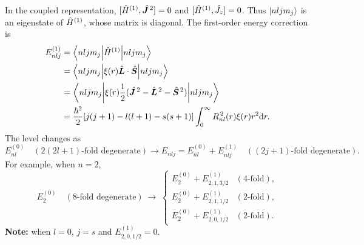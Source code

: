 In the coupled representation, $[\hat{H}^{(1)},\hat{\bm{J}}^{\,2}]=0$ and $[\hat{H}^{(1)},\hat{J}_z]=0$. Thus $\left|nljm_j\right\rangle$ is an eigenstate of $\hat{H}^{(1)}$, whose matrix is diagonal. The first-order energy correction is
\begin{equation}\begin{aligned}
 E_{nlj}^{(1)}&=\left\langle nljm_j\middle|\hat{H}^{(1)}\middle|nljm_j\right\rangle\\
 &=\left\langle nljm_j\middle|\xi(r)\hat{\bm{L}}\cdot\hat{\bm{S}}\middle|nljm_j\right\rangle\\
 &=\left\langle nljm_j\middle|\xi(r)\frac12
 (\hat{\bm{J}}^{\,2}-\hat{\bm{L}}^{\,2}-\hat{\bm{S}}^{\,2})\middle|nljm_j\right\rangle\\
 &=\frac{\hbar^2}{2}[j(j+1)-l(l+1)-s(s+1)]
 \int_0^\infty R_{nl}^{\,2}(r)\xi(r)r^2\mathrm{d} r.
\end{aligned}\end{equation}
The level changes as
\begin{equation}
 E_{nl}^{(0)}\quad(2(2l+1)\text{-fold degenerate})
 \longrightarrow E_{nlj}=E_{nl}^{(0)}+E_{nlj}^{(1)}
 \quad((2j+1)\text{-fold degenerate}).
\end{equation}
For example, when $n=2$,
\begin{equation}
 E_2^{(0)}\quad(8\text{-fold degenerate})\ \longrightarrow\
 \begin{cases}
 E_2^{(0)}+E_{2,1,3/2}^{(1)} & (4\text{-fold}),\\
 E_2^{(0)}+E_{2,1,1/2}^{(1)} & (2\text{-fold}),\\
 E_2^{(0)}+E_{2,0,1/2}^{(1)} & (2\text{-fold}).
 \end{cases}
\end{equation}
\textbf{Note:} when $l=0$, $j=s$ and $E_{2,0,1/2}^{(1)}=0$.

